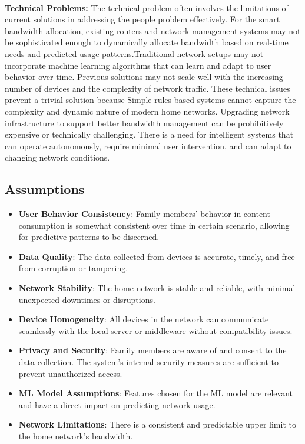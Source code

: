\documentclass[10pt]{article}
\begin{document}
\paragraph{}
\textbf{Technical Problems:} The technical problem often involves the limitations of current solutions in addressing the people problem effectively. For the smart bandwidth allocation, existing routers and network management systems may not be sophisticated enough to dynamically allocate bandwidth based on real-time needs and predicted usage patterns.Traditional network setups may not incorporate machine learning algorithms that can learn and adapt to user behavior over time. Previous solutions may not scale well with the increasing number of devices and the complexity of network traffic.
These technical issues prevent a trivial solution because Simple rules-based systems cannot capture the complexity and dynamic nature of modern home networks. Upgrading network infrastructure to support better bandwidth management can be prohibitively expensive or technically challenging. There is a need for intelligent systems that can operate autonomously, require minimal user intervention, and can adapt to changing network conditions.


\subsection{Assumptions}
\begin{itemize}
  \item \textbf{User Behavior Consistency}: Family members’ behavior in content consumption is somewhat consistent over time in certain scenario, allowing for predictive patterns to be discerned.
  \item \textbf{Data Quality}: The data collected from devices is accurate, timely, and free from corruption or tampering.
  \item \textbf{Network Stability}: The home network is stable and reliable, with minimal unexpected downtimes or disruptions.
  \item \textbf{Device Homogeneity}: All devices in the network can communicate seamlessly with the local server or middleware without compatibility issues.
  \item \textbf{Privacy and Security}: Family members are aware of and consent to the data collection. The system’s internal security measures are sufficient to prevent unauthorized access.
  \item \textbf{ML Model Assumptions}: Features chosen for the ML model are relevant and have a direct impact on predicting network usage.
  \item \textbf{Network Limitations}: There is a consistent and predictable upper limit to the home network’s bandwidth.
\end{itemize}
\end{document}
